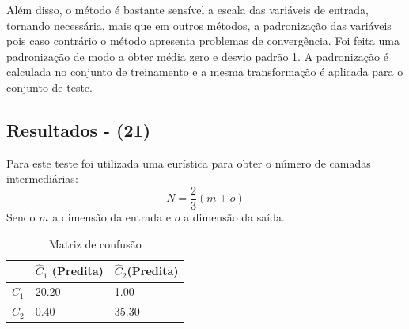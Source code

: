 \documentclass[11pt,a4paper]{article}
\numberwithin{equation}{section}
\begin{document}
Além disso, o método é bastante sensível a escala das variáveis de entrada, tornando necessária, mais que em outros métodos, a padronização das variáveis pois caso contrário o método apresenta problemas de convergência. Foi feita uma padronização de modo a obter média zero e desvio padrão 1. A padronização é calculada no conjunto de treinamento e a mesma transformação é aplicada para o conjunto de teste.

\subsection{Resultados - (21)}

Para este teste foi utilizada uma eurística para obter o número de camadas intermediárias: 
\[N = \frac{2}{3} (m+o)\]
Sendo $m$ a dimensão da entrada e $o$ a dimensão da saída.
\begin{table}[H]
\centering
\caption{Matriz de confusão}
\begin{tabular}{l l l}
\hline
 & \textbf{$\hat{C}_1$ (Predita)} & \textbf{$\hat{C}_2$(Predita)}\\
\hline
$C_1$ & 20.20&1.00\\
$C_2$ & 0.40&35.30\\ 
\hline
\end{tabular}
\end{table}
\end{document}
